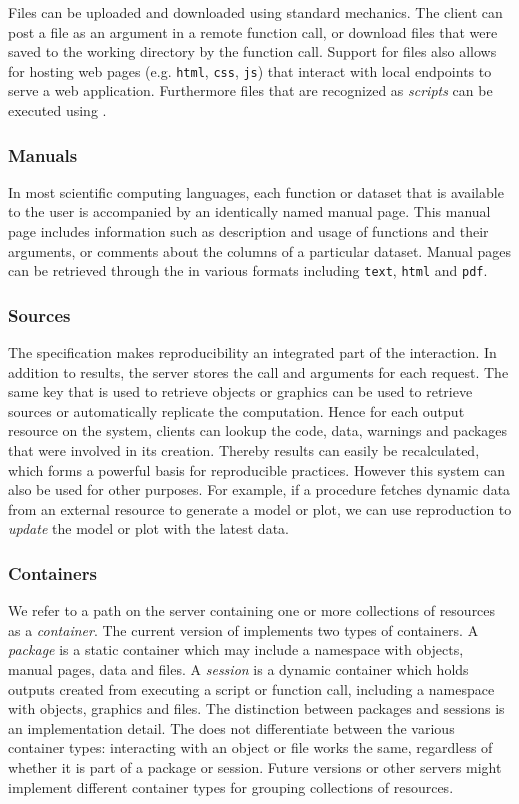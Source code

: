 Files can be uploaded and downloaded using standard \HTTP mechanics. The client can post a file as an argument in a remote function call, or download files that were saved to the working directory by the function call. Support for files also allows for hosting web pages (e.g. \texttt{html}, \texttt{css}, \texttt{js}) that interact with local \API endpoints to serve a web application. Furthermore files that are recognized as \emph{scripts} can be executed using \RPC.

\subsubsection{Manuals}

In most scientific computing languages, each function or dataset that is available to the user is accompanied by an identically named manual page. This manual page includes information such as description and usage of functions and their arguments, or comments about the columns of a particular dataset. Manual pages can be retrieved through the \API in various formats including \texttt{text}, \texttt{html} and \texttt{pdf}.

\subsubsection{Sources}

The \OpenCPU specification makes reproducibility an integrated part of the \API interaction. In addition to results, the server stores the call and arguments for each \RPC request. The same key that is used to retrieve objects or graphics can be used to retrieve sources or automatically replicate the computation. Hence for each output resource on the system, clients can lookup the code, data, warnings and packages that were involved in its creation. Thereby results can easily be recalculated, which forms a powerful basis for reproducible practices. However this system can also be used for other purposes. For example, if a procedure fetches dynamic data from an external resource to generate a model or plot, we can use reproduction to \emph{update} the model or plot with the latest data.

\subsubsection{Containers}

We refer to a path on the server containing one or more collections of resources as a \emph{container}. The current version of \OpenCPU implements two types of containers. A \emph{package} is a static container which may include a namespace with \R objects, manual pages, data and files.  A \emph{session} is a dynamic container which holds outputs created from executing a script or function call, including a namespace with \R objects, graphics and files. The distinction between packages and sessions is an implementation detail. The \API does not differentiate between the various container types: interacting with an object or file works the same, regardless of whether it is part of a package or session. Future versions or other servers might implement different container types for grouping collections of resources.

